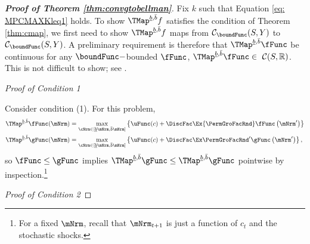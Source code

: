 \documentclass[\econtexRoot/BufferStockTheory]{subfiles}
\begin{document}
\begin{proof}[\textbf{Proof of Theorem \ref{thm:convgtobellman}}]
Fix $k$ such that Equation \eqref{eq: MPCMAXKleq1} holds. To show $\TMap^{\underline{b}, \bar{b}} f$ satisfies the condition of Theorem \ref{thm:cmap}, we first need to show  $\TMap^{\underline{b}, \bar{b}} f$ maps from $\mathcal{C}_{\boundFunc}(S,Y)$ to $\mathcal{C}_{\boundFunc}(S,Y)$. A preliminary requirement is therefore that $\TMap^{\underline{b}, \bar{b}} \fFunc$ be continuous for any $\boundFunc-$bounded $\fFunc$, $\TMap^{\underline{b}, \bar{b}} \fFunc  \in~\mathcal{C}(S,\mathbb{R})$.  This is not difficult to show; see \cite{hiraguchiBSProofs}.



\vspace{0.7em} %
\noindent\textit{Proof of Condition 1}  %
\vspace{0.7em} %

Consider condition (1). For this problem,
\begin{align*}
  \TMap^{\underline{b}, \bar{b}}{\fFunc}(\mNrm) & = \underset{\cNrm \in
                                            [\underline{b} \mNrm, \bar{b} \mNrm]
                                            }\max \left\{
                                            \uFunc(c)+\DiscFac \Ex{\PermGroFacRnd}\fFunc
                                            \left({\mNrm^{\prime}}\right) \right\}  \notag  \label{eq:condition1}
  \\
  \TMap^{\underline{b}, \bar{b}}{\gFunc}(\mNrm) &= \underset{\cNrm \in
                                            [\underline{b} \mNrm, \bar{b} \mNrm]
                                            }\max \left\{
                                            \uFunc(c)+\DiscFac \Ex \PermGroFacRnd^{\prime} \gFunc
                                            \left( \mNrm^{\prime}\right)\right\} ,  \notag
\end{align*}%
so $\fFunc \leq \gFunc$ implies $\TMap^{\underline{b}, \bar{b}} \gFunc \leq \TMap^{\underline{b}, \bar{b}} \gFunc $ pointwise by inspection.\footnote{For a fixed $\mNrm$, recall that ${\mNrm}_{t+1}$ is just a function of $c_{t}$ and the
  stochastic shocks.}


\vspace{0.7em} %
\noindent\textit{Proof of Condition 2}  %
\vspace{0.7em} %



\end{proof}
\end{document}
